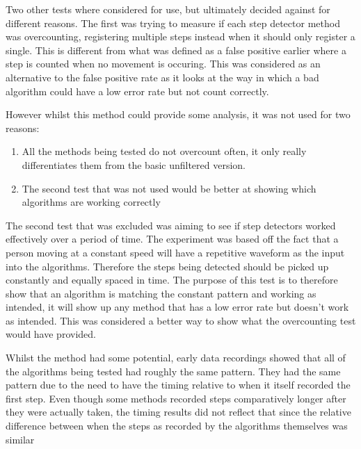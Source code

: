 \documentclass[main.tex]{subfiles}
\begin{document}
Two other tests where considered for use, but ultimately decided against for different reasons. The first was trying to measure if each step detector method was overcounting, registering multiple steps instead when it should only register a single. This is different from what was defined as a false positive earlier where a step is counted when no movement is occuring. This was considered as an alternative to the false positive rate as it looks at the way in which a bad algorithm could have a low error rate but not count correctly. 

However whilst this method could provide some analysis, it was not used for two reasons:

\begin{enumerate}
	\item All the methods being tested do not overcount often, it only really differentiates them from the basic unfiltered version.
	\item The second test that was not used would be better at showing which algorithms are working correctly
\end{enumerate}

The second test that was excluded was aiming to see if step detectors worked effectively over a period of time. The experiment was based off the fact that a person moving at a constant speed will have a repetitive waveform as the input into the algorithms. Therefore the steps being detected should be picked up constantly and equally spaced in time. The purpose of this test is to therefore show that an algorithm is matching the constant pattern and working as intended, it will show up any method that has a low error rate but doesn't work as intended. This was considered a better way to show what the overcounting test would have provided.

Whilst the method had some potential, early data recordings showed that all of the algorithms being tested had roughly the same pattern. They had the same pattern due to the need to have the timing relative to when it itself recorded the first step. Even though some methods recorded steps comparatively longer after they were actually taken, the timing results did not reflect that since the relative difference between when the steps as recorded by the algorithms themselves was similar
\end{document}
